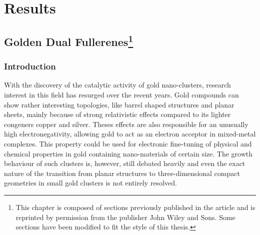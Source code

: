
\part{Results}
\label{sec:results}

\chapter[Golden Dual Fullerenes]{Golden Dual Fullerenes\footnote{This chapter is
    composed of sections previously published in the article
    \autocite{Trombach_HollowGoldCages_2016}
    and is reprinted by permission from the publisher 
    John Wiley and Sons. Some sections have been modified to fit
    the style of this thesis.}}
\label{sec:goldendualfullerenes}

\section{Introduction}
\label{sec:introGold}

With the discovery of the catalytic activity of gold
nano-clusters\autocite{Haruta1987,Haruta2003,Haruta2007,Haruta2007a}, research
interest in this field has resurged over the recent
years\autocite{Schwerdtfeger_Goldgoesnano_2003,Hakkinen2008,Maity2012,Zhang2012a,Gong2012,Miao2012,Kyoungweon-2013}.
Gold compounds can show rather interesting topologies, like barrel shaped
structures\autocite{Chen-2015} and planar
sheets,\autocite{Bravo-Perez-1999,Hakkinen2000,Landman2002} mainly because of
strong relativistic effects compared to its lighter congeners copper and
silver\autocite{Pyykko-1988,Schwerdtfeger-2002HA,Pyykko-2004,Pyykko-2007a,Huang-2008,Schwerdtfeger-Lein-2009,pyykko-2012relativistic}.
Theses effects are also responsible for an unusually high electronegativity,
allowing gold to act as an electron acceptor in mixed-metal
complexes.\autocite{Schwerdtfeger-2002HA} This property could be used for
electronic fine-tuning of physical and chemical properties in gold containing
nano-materials of certain size.\autocite{Schwerdtfeger_Goldgoesnano_2003} The
growth behaviour of such clusters is, however, still debated
heavily\autocite{Zhao-2010,Barnard-2010,Tian-2011} and even the exact nature of
the transition from planar structures to three-dimensional compact geometries in
small gold clusters is not entirely
resolved.\autocite{Johansson_2D3Dtransitiongold_2008,Fa-Luong-2008,Assadollahzadeh_systematicsearchminimum_2009,Wang-Pal-2010,Wang-Wang-2011,Wang-Wang-2011,Barnard-2012,Gotz_performancedensityfunctional_2013,Kinaci_UnravelingPlanarGlobularTransition_2016}

